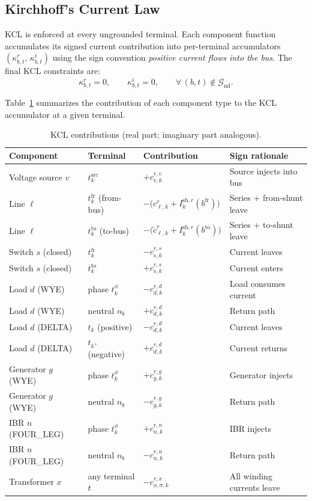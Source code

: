 \documentclass[11pt,a4paper]{article}
\newcommand{\mc}[1]{\mathcal{#1}}
\begin{document}
\subsection{Kirchhoff's Current Law}

KCL is enforced at every ungrounded terminal.  Each component function
accumulates its signed current contribution into per-terminal accumulators
$(\kappa^r_{b,t},\,\kappa^i_{b,t})$ using the sign convention
\emph{positive current flows into the bus}.  The final KCL constraints are:
%
\begin{equation}
  \kappa^r_{b,t} = 0,\qquad
  \kappa^i_{b,t} = 0,\qquad
  \forall\,(b,t)\notin\mc{G}_\text{nd}.
  \label{eq:kcl}
\end{equation}

Table~\ref{tab:kcl} summarizes the contribution of each component type to the
KCL accumulator at a given terminal.

\begin{table}[h!]
\centering
\caption{KCL contributions (real part; imaginary part analogous).}
\label{tab:kcl}
\renewcommand{\arraystretch}{1.3}
\begin{tabular}{@{}llll@{}}
\toprule
Component & Terminal & Contribution & Sign rationale \\
\midrule
Voltage source $v$ & $t^\text{src}_k$ & $+c^{r,v}_{v,k}$ & Source injects into bus \\
Line $\ell$ & $t^\text{fr}_k$ (from-bus) & $-\bigl(c^r_{\ell,k} + I^{\text{sh},r}_k(b^\text{fr})\bigr)$ & Series + from-shunt leave \\
Line $\ell$ & $t^\text{to}_k$ (to-bus) & $-\bigl(\tilde{c}^r_{\ell,k} + I^{\text{sh},r}_k(b^\text{to})\bigr)$ & Series + to-shunt leave \\
Switch $s$ (closed) & $t^\text{fr}_k$ & $-c^{r,s}_{s,k}$ & Current leaves \\
Switch $s$ (closed) & $t^\text{to}_k$ & $+c^{r,s}_{s,k}$ & Current enters \\
Load $d$ (WYE) & phase $t^\phi_k$ & $-c^{r,d}_{d,k}$ & Load consumes current \\
Load $d$ (WYE) & neutral $n_b$ & $+c^{r,d}_{d,k}$ & Return path \\
Load $d$ (DELTA) & $t_k$ (positive) & $-c^{r,d}_{d,k}$ & Current leaves \\
Load $d$ (DELTA) & $t_{k^+}$ (negative) & $+c^{r,d}_{d,k}$ & Current returns \\
Generator $g$ (WYE) & phase $t^\phi_k$ & $+c^{r,g}_{g,k}$ & Generator injects \\
Generator $g$ (WYE) & neutral $n_b$ & $-c^{r,g}_{g,k}$ & Return path \\
IBR $n$ (FOUR\_LEG) & phase $t^\phi_k$ & $+c^{r,n}_{n,k}$ & IBR injects \\
IBR $n$ (FOUR\_LEG) & neutral $n_b$ & $-c^{r,n}_{n,k}$ & Return path \\
Transformer $x$ & any terminal $t$ & $-c^{r,x}_{x,\sigma,k}$ & All winding currents leave \\
\bottomrule
\end{tabular}
\end{table}
\end{document}
